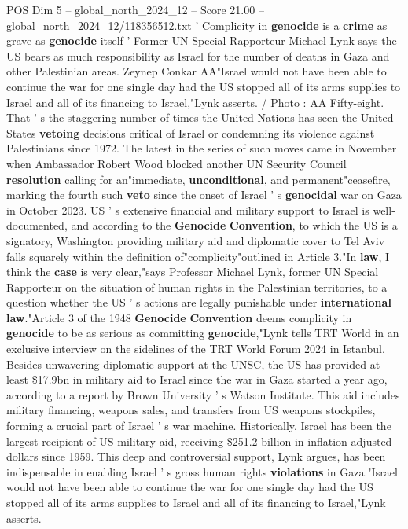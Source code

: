 \begin{textsample}{POS Dim 5 – global\_north\_2024\_12 – Score 21.00 – global\_north\_2024\_12/118356512.txt}  \label{ex:f5_pos_121}
' Complicity in \textbf{genocide} is a \textbf{crime} as grave as \textbf{genocide} itself ' Former UN Special Rapporteur Michael Lynk says the US bears as much responsibility as Israel for the number of deaths in Gaza and other Palestinian areas.
Zeynep Conkar AA"Israel would not have been able to continue the war for one single day had the US stopped all of its arms supplies to Israel and all of its financing to Israel,"Lynk asserts. / Photo : AA Fifty-eight.
That ' s the staggering number of times the United Nations has seen the United States \textbf{vetoing} decisions critical of Israel or condemning its violence against Palestinians since 1972.
The latest in the series of such moves came in November when Ambassador Robert Wood blocked another UN Security Council \textbf{resolution} calling for an"immediate, \textbf{unconditional}, and permanent"ceasefire, marking the fourth such \textbf{veto} since the onset of Israel ' s \textbf{genocidal} war on Gaza in October 2023.
US ' s extensive financial and military support to Israel is well-documented, and according to the \textbf{Genocide} \textbf{Convention}, to which the US is a signatory, Washington providing military aid and diplomatic cover to Tel Aviv falls squarely within the definition of"complicity"outlined in Article 3."In \textbf{law}, I think the \textbf{case} is very clear,"says Professor Michael Lynk, former UN Special Rapporteur on the situation of human rights in the Palestinian territories, to a question whether the US ' s actions are legally punishable under \textbf{international} \textbf{law}."Article 3 of the 1948 \textbf{Genocide} \textbf{Convention} deems complicity in \textbf{genocide} to be as serious as committing \textbf{genocide},"Lynk tells TRT World in an exclusive interview on the sidelines of the TRT World Forum 2024 in Istanbul.
Besides unwavering diplomatic support at the UNSC, the US has provided at least \$17.9bn in military aid to Israel since the war in Gaza started a year ago, according to a report by Brown University ' s Watson Institute.
This aid includes military financing, weapons sales, and transfers from US weapons stockpiles, forming a crucial part of Israel ' s war machine.
Historically, Israel has been the largest recipient of US military aid, receiving \$251.2 billion in inflation-adjusted dollars since 1959.
This deep and controversial support, Lynk argues, has been indispensable in enabling Israel ' s gross human rights \textbf{violations} in Gaza."Israel would not have been able to continue the war for one single day had the US stopped all of its arms supplies to Israel and all of its financing to Israel,"Lynk asserts.

\end{textsample}
